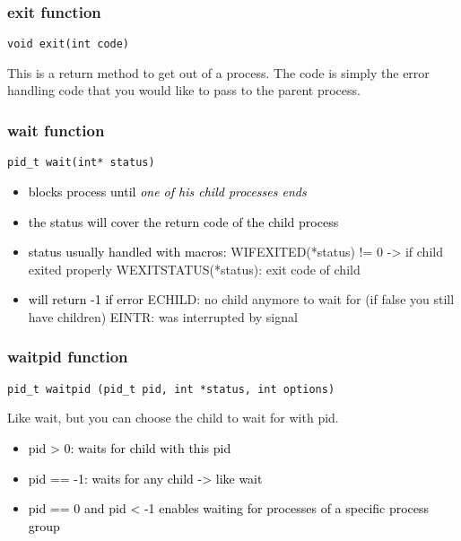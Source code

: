 \documentclass[main.tex,fontsize=8pt,paper=a4,paper=portrait,DIV=calc,]{scrartcl}
\begin{document}
\subsubsection{exit function}
\begin{lstlisting}
void exit(int code)
\end{lstlisting}
This is a return method to get out of a process.\newline
The code is simply the error handling code that you would like to pass to the parent process.

\subsubsection{wait function}
\begin{lstlisting}
pid_t wait(int* status)
\end{lstlisting}
\begin{itemize}
  \item \textcolor{black}{blocks process until \emph{one of his child processes ends}}
\item \textcolor{black}{the status will cover the return code of the child process}
\item \textcolor{black}{status usually handled with macros:}\newline
  WIFEXITED(*status) != 0 -> if child exited properly \newline
  WEXITSTATUS(*status): exit code of child
\item \textcolor{black}{will return -1 if error}\newline
  ECHILD: no child anymore to wait for (if false you still have children)\newline
  EINTR: was interrupted by signal
\end{itemize} 

\subsubsection{waitpid function}
\begin{lstlisting}
pid_t waitpid (pid_t pid, int *status, int options)
\end{lstlisting}
Like wait, but you can choose the child to wait for with pid.
\begin{itemize}
\item \textcolor{black}{pid > 0: waits for child with this pid}
\item \textcolor{black}{pid == -1: waits for any child -> like wait}
\item \textcolor{black}{pid == 0 and pid < -1 enables waiting for processes of a specific process group}
\end{itemize} 
\end{document}

